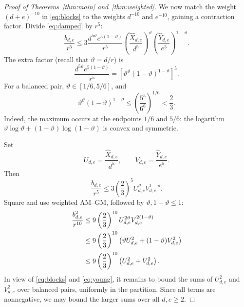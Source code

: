 \documentclass[11pt]{amsart}
\theoremstyle{remark}
\numberwithin{equation}{section}
\begin{document}
\begin{proof}[Proof of Theorems~\ref{thm:main} and~\ref{thm:weighted}]
We now match the weight $(d+e)^{-10}$ in \eqref{eq:blocks} to the weights
$d^{-10}$ and $e^{-10}$, gaining a contraction factor.
Divide \eqref{eq:damped} by $r^5$:
\[
\frac{b_{d,e}}{r^5}\le
3\frac{d^{5\vartheta}e^{5(1-\vartheta)}}{r^5}
\left(\frac{\widehat X_{d,e}}{d^5}\right)^\vartheta
\left(\frac{\widehat Y_{d,e}}{e^5}\right)^{1-\vartheta}.
\]
The extra factor (recall that $\vartheta=d/r$) is
\[
\frac{d^{5\vartheta}e^{5(1-\vartheta)}}{r^5}
=\left[\vartheta^\vartheta(1-\vartheta)^{1-\vartheta}\right]^5.
\]
For a balanced pair, $\vartheta\in[1/6,5/6]$, and
\[
\vartheta^\vartheta(1-\vartheta)^{1-\vartheta}
\le\left(\frac{5^5}{6^6}\right)^{1/6}<\frac23.
\]
Indeed, the maximum occurs at the endpoints $1/6$ and $5/6$: the logarithm
$\vartheta\log\vartheta+(1-\vartheta)\log(1-\vartheta)$ is convex and symmetric.

Set
\[
U_{d,e}=\frac{\widehat X_{d,e}}{d^5},\qquad
V_{d,e}=\frac{\widehat Y_{d,e}}{e^5}.
\]
Then
\[
\frac{b_{d,e}}{r^5}\le3\left(\frac23\right)^5
U_{d,e}^\vartheta V_{d,e}^{1-\vartheta}.
\]
Square and use weighted AM--GM, followed by $\vartheta,1-\vartheta\le1$:
\begin{align}
\frac{b_{d,e}^2}{r^{10}}
&\le9\left(\frac23\right)^{10}
U_{d,e}^{2\vartheta}V_{d,e}^{2(1-\vartheta)}\notag\\
&\le9\left(\frac23\right)^{10}
\left(\vartheta U_{d,e}^2+(1-\vartheta)V_{d,e}^2\right)\notag\\
&\le9\left(\frac23\right)^{10}
\left(U_{d,e}^2+V_{d,e}^2\right).
\label{eq:young}
\end{align}
In view of \eqref{eq:blocks} and \eqref{eq:young}, it remains to bound the
sums of $U_{d,e}^2$ and $V_{d,e}^2$ over balanced pairs, uniformly in the
partition. Since all terms are nonnegative, we may bound the larger sums
over all $d,e\ge2$.


\end{proof}
\end{document}
